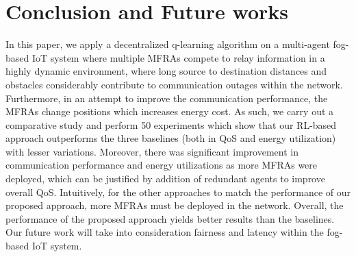 \documentclass[journal]{IEEEtran}
\begin{document}
\section{Conclusion and Future works}
In this paper, we apply a decentralized q-learning algorithm on a multi-agent fog-based IoT system where multiple MFRAs compete to relay information in a highly dynamic environment, where long source to destination distances and obstacles considerably contribute to communication outages within the network. Furthermore, in an attempt to improve the communication performance, the MFRAs change positions which increases energy cost. As such, we carry out a comparative study and perform 50 experiments which show that our RL-based approach outperforms the three baselines (both in QoS and energy utilization) with lesser variations. Moreover, there was significant improvement in communication performance and energy utilizations as more MFRAs were deployed, which can be justified by addition of redundant agents to improve overall QoS. Intuitively, for the other approaches to match the performance of our proposed approach, more MFRAs must be deployed in the network. Overall, the performance of the proposed approach yields
better results than the baselines. Our future work will take into consideration fairness and latency within the fog-based IoT system. 




\ifCLASSOPTIONcaptionsoff
  \newpage
\fi



\end{document}
